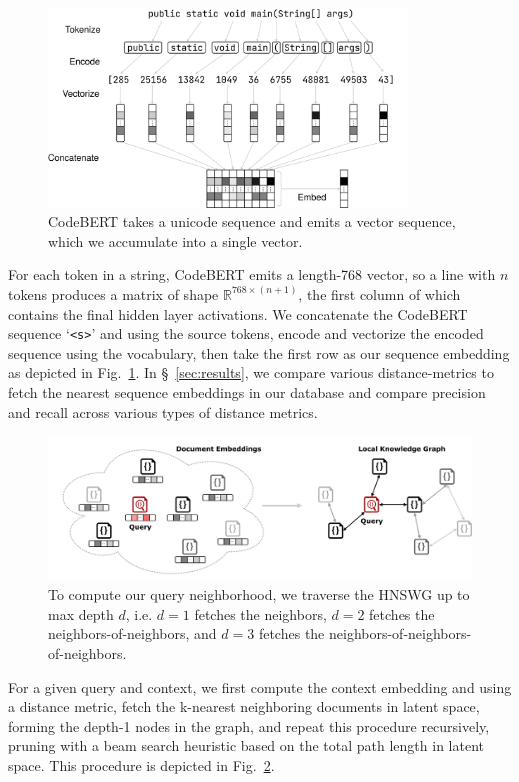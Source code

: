 \documentclass[11pt]{article}
\begin{document}
\begin{figure}[H]
  \centering
  \includegraphics[width=0.85\textwidth]{bert_embedding}
  \caption{CodeBERT takes a unicode sequence and emits a vector sequence, which we accumulate into a single vector.}
  \label{fig:bert}
\end{figure}

For each token in a string, CodeBERT emits a length-768 vector, so a line with $n$ tokens produces a matrix of shape $\mathbb R^{768 \times (n + 1)}$, the first column of which contains the final hidden layer activations. We concatenate the CodeBERT sequence `\texttt{<s>}' and using the source tokens, encode and vectorize the encoded sequence using the vocabulary, then take the first row as our sequence embedding as depicted in Fig.~\ref{fig:bert}. In \S~\ref{sec:results}, we compare various distance-metrics to fetch the nearest sequence embeddings in our database and compare precision and recall across various types of distance metrics.

\begin{figure}[H]
  \centering
  \includegraphics[width=\textwidth]{latent_kg}
  \caption{To compute our query neighborhood, we traverse the HNSWG up to max depth $d$, i.e. $d=1$ fetches the neighbors, $d=2$ fetches the neighbors-of-neighbors, and $d=3$ fetches the neighbors-of-neighbors-of-neighbors.}
  \label{fig:de2kg}
\end{figure}

For a given query and context, we first compute the context embedding and using a distance metric, fetch the k-nearest neighboring documents in latent space, forming the depth-1 nodes in the graph, and repeat this procedure recursively, pruning with a beam search heuristic based on the total path length in latent space. This procedure is depicted in Fig.~\ref{fig:de2kg}.
\end{document}
